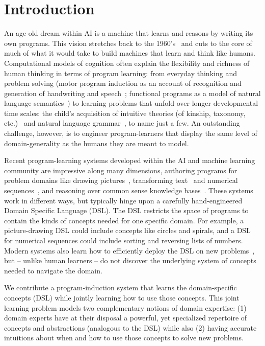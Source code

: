 \documentclass{article}
\begin{document}
\section{Introduction}


An age-old dream within AI is a machine that learns and reasons by
writing its own programs.  This vision stretches back to the
1960's~\cite{solomonoff1964formal} and cuts to the core of much of
what it would take to build machines that learn and think like humans.
Computational models of cognition often explain the flexibility and
richness of human thinking in terms of program learning: from everyday
thinking and problem solving (motor program induction as an account of
recognition and generation of handwriting and
speech~\cite{lake2015human}; functional programs as a model of natural
language semantics~\cite{SOMETHING}) to learning problems that unfold
over longer developmental time scales: the child's acquisition of
intuitive theories (of kinship, taxonomy, etc.)~\cite{Ullman2012} and
natural language grammar~\cite{DBLP:journals/cogsr/SchmidK11}, to name
just a few.  An outstanding challenge, however, is to engineer
program-learners that display the same level of domain-generality as
the humans they are meant to model.

Recent program-learning systems developed within the AI and machine
learning community are impressive along many dimensions, authoring
programs for problem domains like drawing
pictures~\cite{spiral,ellis2017learning}, transforming
text~\cite{gulwani2011automating} and numerical
sequences~\cite{balog2016deepcoder}, and reasoning over common sense
knowledge bases~\cite{muggleton2015meta}.  These systems work in
different ways, but typically hinge upon a carefully hand-engineered
Domain Specific Language (DSL).  The DSL restricts the space of
programs to contain the kinds of concepts needed for one specific
domain.  For example, a picture-drawing DSL could include concepts
like circles and spirals, and a DSL for numerical sequences could
include sorting and reversing lists of numbers.  Modern systems also
learn how to efficiently deploy the DSL on new
problems~\cite{devlin2017robustfill,balog2016deepcoder,NGDS}, but --
unlike human learners -- do not discover the underlying system of
concepts needed to navigate the domain.

We contribute a program-induction system that learns the
domain-specific concepts (DSL) while jointly learning how to use those
concepts.  This joint learning problem models two complementary
notions of domain expertise: (1) domain experts have at their disposal
a powerful, yet specialized repertoire of concepts and abstractions
(analogous to the DSL) while also (2) having accurate intuitions about
when and how to use those concepts to solve new problems.
\end{document}
